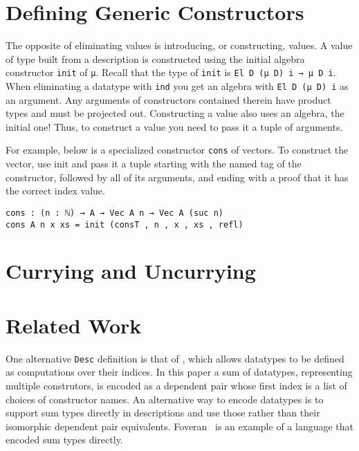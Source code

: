 \documentclass[preprint,nonatbib]{sigplanconf}
\begin{document}
\section{Defining Generic Constructors}
\label{sec:init}

The opposite of eliminating values is introducing, or constructing,
values. A value of type built from a description is constructed using
the initial algebra constructor {\tt init} of {\tt μ}. Recall that the
type of {\tt init} is {\tt El D (μ D) i → μ D i}. When eliminating a
datatype with {\tt ind} you get an algebra with {\tt El D (μ D) i} as
an argument. Any arguments of constructors contained therein have
product types and  must be projected out.
Constructing a value also uses an algebra, the initial
one! Thus, to construct a value you need to pass it a tuple of
arguments.

For example, below is a specialized constructor {\tt cons}
of vectors. To construct the vector, use init and pass it a tuple
starting with the named tag of the constructor, followed by all of its
arguments, and ending with a proof that it has the correct
index value.

\begin{verbatim}
cons : (n : ℕ) → A → Vec A n → Vec A (suc n)
cons A n x xs = init (consT , n , x , xs , refl)
\end{verbatim}



\section{Currying and Uncurrying}
\label{sec:curry}


\section{Related Work}
\label{sec:related-work}

One alternative {\tt Desc} definition is that of \citet{dagand:phd}, which
allows datatypes to be defined as computations over their indices.
In this paper a sum of datatypes, representing multiple construtors,
is encoded as a dependent pair whose first index is a list of choices
of constructor names. An alternative way to encode datatypes is to
support sum types directly in descriptions and use those rather than
their isomorphic dependent pair equivalents. Foveran~\citep{foveran} is
an example of a language that encoded sum types directly.


\clearpage

\acks




\end{document}
